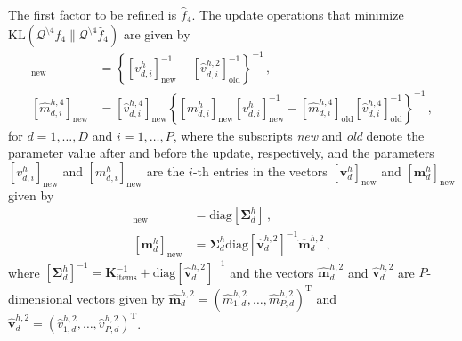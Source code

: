 \documentclass{article}
\begin{document}
The first factor to be refined is $\hat{f}_4$. The update operations that minimize
$\text{KL}(\mathcal{Q}^{\setminus 4} f_4 \| \mathcal{Q}^{\setminus 4} \hat{f}_4)$ are given by
\begin{align}
[\hat{v}_{d,i}^{h,4}]_\text{new} & =
\left\{ [v_{d,i}^{h}]_\text{new}^{-1} - [\hat{v}_{d,i}^{h,2} ]_\text{old}^{-1}\right\}^{-1}\,,\\
[\hat{m}_{d,i}^{h,4}]_\text{new} & =
[\hat{v}_{d,i}^{h,4}]_\text{new} \left\{[ m_{d,i}^{h}]_\text{new} 
[v_{d,i}^{h}]_\text{new}^{-1} - [\hat{m}_{d,i}^{h,4}]_\text{old} [\hat{v}_{d,i}^{h,4}]_\text{old}^{-1}\right\}^{-1}\,,
\end{align}
for $d = 1,\ldots,D$ and $i = 1,\ldots,P$,
where the subscripts \emph{new} and \emph{old} denote the parameter value after and before the update, respectively, and
the parameters $[v_{d,i}^{h}]_\text{new}$ and $[ m_{d,i}^{h}]_\text{new}$ are the $i$-th entries in the vectors
$[\mathbf{v}_{d}^{h}]_\text{new}$ and $[\mathbf{m}_{d}^{h}]_\text{new}$ given by
\begin{align}
[\mathbf{v}_{d}^{h}]_\text{new} & = \text{diag}\left[ \bm \Sigma_d^h \right]\,,\label{eq:Sigmah} \\
[\mathbf{m}_{d}^{h}]_\text{new} & = \bm \Sigma_d^h \text{diag}[\hat{\mathbf{v}}_d^{h,2}]^{-1} \hat{\mathbf{m}}_d^{h,2}\label{eq:Sigma2h}\,,
\end{align}
where $[\bm \Sigma_d^h]^{-1} = \mathbf{K}^{-1}_\text{items} + \text{diag}[\hat{\mathbf{v}}_d^{h,2}]^{-1}$
and the vectors
$\hat{\mathbf{m}}_d^{h,2}$ and $\hat{\mathbf{v}}_d^{h,2}$ are $P$-dimensional vectors given by
$\hat{\mathbf{m}}_d^{h,2}=(\hat{m}_{1,d}^{h,2},\ldots,\hat{m}_{P,d}^{h,2})^\text{T}$ and
$\hat{\mathbf{v}}_d^{h,2}=(\hat{v}_{1,d}^{h,2},\ldots,\hat{v}_{P,d}^{h,2})^\text{T}$.
\end{document}
